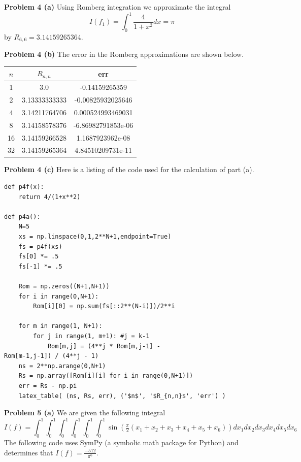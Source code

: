 \documentclass[12pt]{article}
\newcommand{\problem}[1]{\hspace{-4 ex} \large \textbf{Problem #1} }
\begin{document}
\bigbreak
\problem{4 (a)} Using Romberg integration we approximate the integral
$$
I(f_1) = \int_0^1 \frac{4}{1+x^2} dx = \pi
$$
by $R_{6,6} = 3.14159265364$.

\bigbreak
\problem{4 (b)} The error in the Romberg approximations are shown below.

\begin{center}
	\begin{tabular}{|c|c|c|}
		\hline
		$n$&$R_{n,n}$&err\\ \hline
		1&3.0&-0.14159265359\\ \hline
		2&3.13333333333&-0.00825932025646\\ \hline
		4&3.14211764706&0.000524993469031\\ \hline
		8&3.14158578376&-6.86982791853e-06\\ \hline
		16&3.14159266528&1.1687923962e-08\\ \hline
		32&3.14159265364&4.84510209731e-11\\ \hline
	\end{tabular}
\end{center}

\bigbreak
\problem{4 (c)} Here is a listing of the code used for the calculation of part (a).

\begin{lstlisting}
def p4f(x):
	return 4/(1+x**2)

def p4a():
	N=5
	xs = np.linspace(0,1,2**N+1,endpoint=True)
	fs = p4f(xs)
	fs[0] *= .5
	fs[-1] *= .5
	
	Rom = np.zeros((N+1,N+1))
	for i in range(0,N+1):
		Rom[i][0] = np.sum(fs[::2**(N-i)])/2**i
	
	for m in range(1, N+1):
		for j in range(1, m+1): #j = k-1
			Rom[m,j] = (4**j * Rom[m,j-1] - 
Rom[m-1,j-1]) / (4**j - 1)
	ns = 2**np.arange(0,N+1)
	Rs = np.array([Rom[i][i] for i in range(0,N+1)])
	err = Rs - np.pi
	latex_table( (ns, Rs, err), ('$n$', '$R_{n,n}$', 'err') )
\end{lstlisting}

\bigbreak
\problem{5 (a)} We are given the following integral
$$
I(f) = \int_0^1\int_0^1\int_0^1\int_0^1\int_0^1\int_0^1 \sin(\tfrac{\pi}{2}(x_1+x_2+x_3+x_4+x_5+x_6)) dx_1dx_2dx_3dx_4dx_5dx_6
$$
The following code uses SymPy (a symbolic math package for Python) and determines that $I(f) = \frac{-512}{\pi^6}$.
\end{document}
